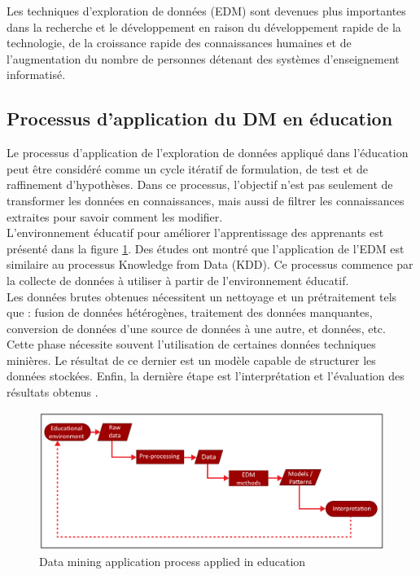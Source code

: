 Les techniques d'exploration de données (EDM) sont devenues plus importantes dans la recherche et le développement en raison du développement rapide de la technologie, de la croissance rapide des connaissances humaines et de l'augmentation du nombre de personnes détenant des systèmes d'enseignement informatisé. \\
    
\subsection{Processus d'application du DM en éducation}
Le processus d'application de l'exploration de données appliqué dans l'éducation peut être considéré comme un cycle itératif de formulation, de test et de raffinement d'hypothèses. Dans ce processus, l'objectif n'est pas seulement de transformer les données en connaissances, mais aussi de filtrer les connaissances extraites pour savoir comment les modifier. \\
L’environnement éducatif pour améliorer l’apprentissage des apprenants est présenté dans la figure \ref{dataMiningProcess}. Des études ont montré que l'application de l'EDM est similaire au processus Knowledge from Data (KDD). Ce processus commence par la collecte de données à utiliser à partir de l'environnement éducatif. \\
Les données brutes obtenues nécessitent un nettoyage et un prétraitement tels que : fusion de données hétérogènes, traitement des données manquantes, conversion de données d'une source de données à une autre, et données, etc. Cette phase nécessite souvent l'utilisation de certaines données techniques minières. Le résultat de ce dernier est un modèle capable de structurer les données stockées. Enfin, la dernière étape est l'interprétation et l'évaluation des résultats obtenus \cite{dm_tuteurs}.

\begin{figure}[H]
	\begin{center}
		\includegraphics[width=\textwidth]{images/chapitre1/Data mining application process applied in education}
	\end{center}
\caption{Data mining application process applied in education}
\label{dataMiningProcess}
\end{figure}

